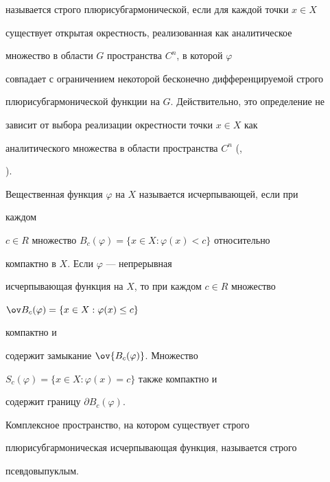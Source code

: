 называется строго плюрисубгармонической, если для каждой точки $x\in X$ 


существует открытая окрестность, реализованная как аналитическое 


множество в области $G$ пространства $C^n$, в которой $\varphi$ 


совпадает с ограничением некоторой бесконечно дифференцируемой строго  


плюрисубгармонической функции на $G$. Действительно, это определение не 


зависит от выбора реализации окрестности точки $x\in X$ как 


аналитического множества в области пространства $C^n$ (\cite{4}, 


\cite{5}). 


 


Вещественная функция $\varphi$ на $X$ называется исчерпывающей, если при 


каждом 


$c\in R$ множество $B_c(\varphi)=\{x\in X:\varphi(x)<c\}$ относительно 


компактно в $X$. Если $\varphi$ --- непрерывная 


исчерпывающая функция на $X$, то при каждом $c\in R$ множество 


$\ov B_c(\varphi)=\{x\in X:\varphi(x)\le c\}$ 


компактно и 


содержит замыкание $\ov{B_c(\varphi)}$. Множество 


$S_c(\varphi)=\{x\in X:\varphi(x)=c\}$ также компактно и 


содержит границу $\partial B_c(\varphi)$. 


 


Комплексное пространство, на котором существует строго 


плюрисубгармоническая исчерпывающая функция, называется строго 


псевдовыпуклым. 


 


